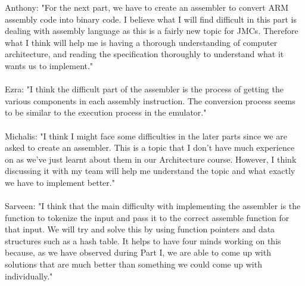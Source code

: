 \documentclass[a4paper]{article}
\begin{document}
Anthony: "For the next part, we have to create an assembler to convert ARM assembly code into binary code. 
               I believe what I will find difficult in this part is dealing with assembly language as this
               is a fairly new topic for JMCs. Therefore what I think will help me is having a thorough 
               understanding of computer architecture, and reading
               the specification thoroughly to understand what it wants us to implement."
\\ \\
Ezra: "I think the difficult part of the assembler is the process of getting the various components in each assembly 
            instruction. The conversion process seems to be similar to the execution process in the emulator."
\\ \\
Michalis: "I think I might face some difficulties in the later parts since we are asked to create an assembler. 
This is a topic that I don't have much experience on as we've just learnt about them in our Architecture course. However, 
I think discussing it with my team will help me understand the topic and what exactly we have to implement better."
\\ \\
Sarveen: "I think that the main difficulty with implementing the assembler is the function to tokenize the input
and pass it to the correct assemble function for that input. We will try and solve this by using function pointers
and data structures such as a hash table. It helps to have four minds working on this because, as we have
observed during Part I, we are able to come up with solutions that are much better than something we could come up
with individually."
\end{document}
